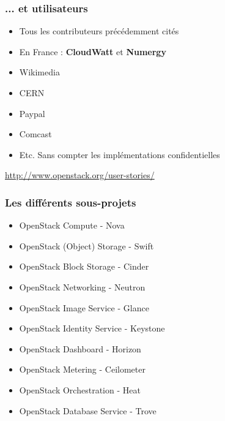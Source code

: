   \begin{frame}
    \frametitle{... et utilisateurs}
    \begin{itemize}
      \item Tous les contributeurs précédemment cités\pause
      \item En France : \textbf{CloudWatt} et \textbf{Numergy}\pause
      \item Wikimedia
      \item CERN
      \item Paypal
      \item Comcast\pause
      \item Etc. Sans compter les implémentations confidentielles
    \end{itemize}
    \url{http://www.openstack.org/user-stories/}
  \end{frame}

  \begin{frame}
    \frametitle{Les différents sous-projets}
    \begin{itemize}
        \item OpenStack Compute - Nova
        \item OpenStack (Object) Storage - Swift\pause
        \item OpenStack Block Storage - Cinder\pause
        \item OpenStack Networking - Neutron\pause
        \item OpenStack Image Service - Glance\pause
        \item OpenStack Identity Service - Keystone\pause
        \item OpenStack Dashboard - Horizon\pause
        \item OpenStack Metering - Ceilometer\pause
        \item OpenStack Orchestration - Heat\pause
        \item OpenStack Database Service - Trove
    \end{itemize}
  \end{frame}

